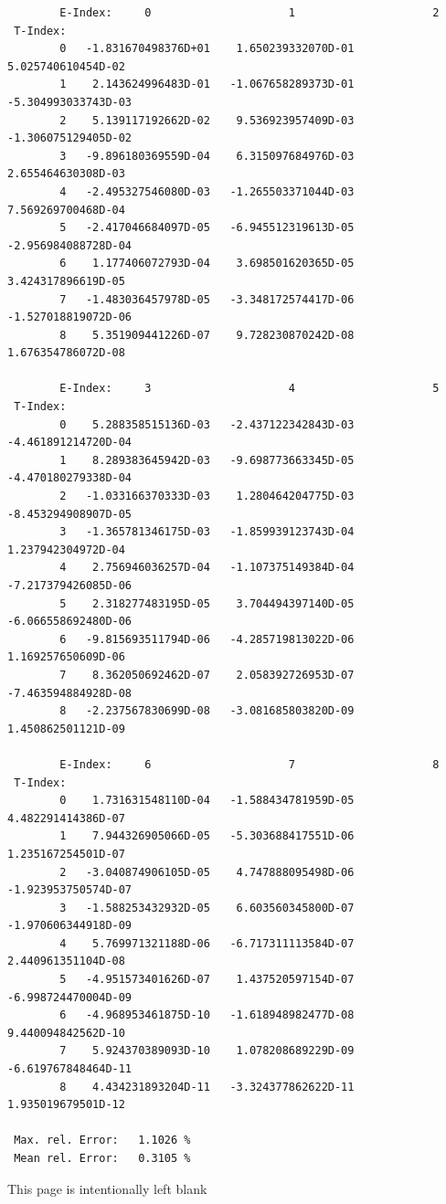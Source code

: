 \documentclass[12pt,dvips]{article}
\begin{document}
\begin{small}\begin{verbatim}
        E-Index:     0                     1                     2
 T-Index:
        0   -1.831670498376D+01    1.650239332070D-01    5.025740610454D-02
        1    2.143624996483D-01   -1.067658289373D-01   -5.304993033743D-03
        2    5.139117192662D-02    9.536923957409D-03   -1.306075129405D-02
        3   -9.896180369559D-04    6.315097684976D-03    2.655464630308D-03
        4   -2.495327546080D-03   -1.265503371044D-03    7.569269700468D-04
        5   -2.417046684097D-05   -6.945512319613D-05   -2.956984088728D-04
        6    1.177406072793D-04    3.698501620365D-05    3.424317896619D-05
        7   -1.483036457978D-05   -3.348172574417D-06   -1.527018819072D-06
        8    5.351909441226D-07    9.728230870242D-08    1.676354786072D-08

        E-Index:     3                     4                     5
 T-Index:
        0    5.288358515136D-03   -2.437122342843D-03   -4.461891214720D-04
        1    8.289383645942D-03   -9.698773663345D-05   -4.470180279338D-04
        2   -1.033166370333D-03    1.280464204775D-03   -8.453294908907D-05
        3   -1.365781346175D-03   -1.859939123743D-04    1.237942304972D-04
        4    2.756946036257D-04   -1.107375149384D-04   -7.217379426085D-06
        5    2.318277483195D-05    3.704494397140D-05   -6.066558692480D-06
        6   -9.815693511794D-06   -4.285719813022D-06    1.169257650609D-06
        7    8.362050692462D-07    2.058392726953D-07   -7.463594884928D-08
        8   -2.237567830699D-08   -3.081685803820D-09    1.450862501121D-09

        E-Index:     6                     7                     8
 T-Index:
        0    1.731631548110D-04   -1.588434781959D-05    4.482291414386D-07
        1    7.944326905066D-05   -5.303688417551D-06    1.235167254501D-07
        2   -3.040874906105D-05    4.747888095498D-06   -1.923953750574D-07
        3   -1.588253432932D-05    6.603560345800D-07   -1.970606344918D-09
        4    5.769971321188D-06   -6.717311113584D-07    2.440961351104D-08
        5   -4.951573401626D-07    1.437520597154D-07   -6.998724470004D-09
        6   -4.968953461875D-10   -1.618948982477D-08    9.440094842562D-10
        7    5.924370389093D-10    1.078208689229D-09   -6.619767848464D-11
        8    4.434231893204D-11   -3.324377862622D-11    1.935019679501D-12

 Max. rel. Error:   1.1026 %
 Mean rel. Error:   0.3105 %

\end{verbatim}\end{small}
\newpage
This page is intentionally left blank
\newpage
\end{document}
